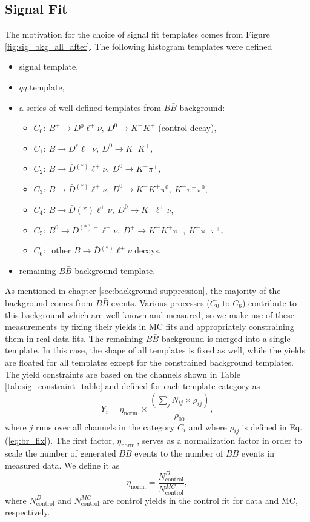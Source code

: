 \subsection{Signal Fit}\label{sec:templates-in-signal-fits}
The motivation for the choice of signal fit templates comes from Figure \ref{fig:sig_bkg_all_after}. The following histogram templates were defined
\begin{itemize}
	\item signal template,
	\item $q \bar q$ template,
	\item a series of well defined templates from $B \bar B$ background:
	\begin{itemize}
		\item $C_0:~B^+ \to \bar{D} {}^0 \ell^+ \nu,~D^0 \to K^-K^+$ (control decay),
		\item $C_1:~B \to \bar{D} {}^* \ell^+ \nu,~D^0 \to K^-K^+$,
		\item $C_2:~B \to \bar{D} {}^{(*)} \ell^+ \nu,~D^0 \to K^-\pi^+$,
		\item $C_3:~B \to \bar{D} {}^{(*)} \ell^+ \nu,~D^0 \to K^-K^+\pi^0,~K^-\pi^+\pi^0$,
		\item $C_4:~B \to \bar{D} {}{(*)} \ell^+ \nu,~D^0 \to K^-\ell^+\nu$,
		\item $C_5:~B^0 \to D^{(*)-} \ell^+ \nu,~D^+ \to K^-K^+\pi^+,~K^-\pi^+\pi^+$,
		\item $C_6:~$ other $B \to \bar D {}^{(*)} \ell^+ \nu$ decays,
	\end{itemize}
	\item remaining $B \bar B$ background template.
\end{itemize}
As mentioned in chapter \ref{sec:background-suppression}, the majority of the background comes from $B \bar B$ events. Various processes ($C_0$ to $C_6$) contribute to this background which are well known and measured, so we make use of these measurements by fixing their yields in MC fits and appropriately constraining them in real data fits. The remaining $B \bar B$ background is merged into a single template. In this case, the shape of all templates is fixed as well, while the yields are floated for all templates except for the constrained background templates. The yield constraints are based on the channels shown in Table \ref{tab:sig_constraint_table} and defined for each template category as 
\begin{equation}
Y_i = \eta_{\mathrm{norm.}} \times \frac{\left(\sum_j N_{ij}\times \rho_{ij} \right)}{\rho_{00}},
\label{eq:sig_fix}
\end{equation}
where $j$ runs over all channels in the category $C_i$ and where $\rho_{ij}$ is defined in Eq. (\ref{eq:br_fix}). The first factor, $\eta_{\mathrm{norm.}}$, serves as a normalization factor in order to scale the number of generated $B \bar B$ events to the number of $B \bar B$ events in measured data. We define it as
\begin{equation}
\eta_{\mathrm{norm.}} = \frac{N_{\mathrm{control}}^D}{N_{\mathrm{control}}^{MC}},
\end{equation}
where $N_{\mathrm{control}}^D$ and $N_{\mathrm{control}}^{MC}$ are control yields in the control fit for data and MC, respectively.

